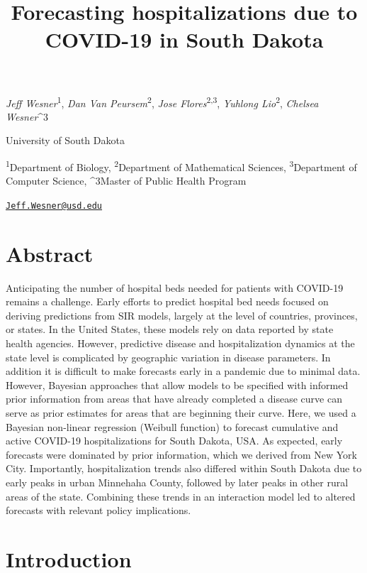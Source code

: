 \documentclass[
]{article}
\title{Forecasting hospitalizations due to COVID-19 in South Dakota}
\author{}
\date{\vspace{-2.5em}}
\begin{document}
\maketitle

\emph{Jeff Wesner}\textsuperscript{1}, \emph{Dan Van Peursem}\textsuperscript{2}, \emph{Jose Flores}\textsuperscript{2,3}, \emph{Yuhlong Lio}\textsuperscript{2}, \emph{Chelsea Wesner}\^{}3

University of South Dakota

\textsuperscript{1}Department of Biology, \textsuperscript{2}Department of Mathematical Sciences, \textsuperscript{3}Department of Computer Science, \^{}3Master of Public Health Program

\href{mailto:Jeff.Wesner@usd.edu}{\nolinkurl{Jeff.Wesner@usd.edu}}

\hypertarget{abstract}{%
\section{Abstract}\label{abstract}}

Anticipating the number of hospital beds needed for patients with COVID-19 remains a challenge. Early efforts to predict hospital bed needs focused on deriving predictions from SIR models, largely at the level of countries, provinces, or states. In the United States, these models rely on data reported by state health agencies. However, predictive disease and hospitalization dynamics at the state level is complicated by geographic variation in disease parameters. In addition it is difficult to make forecasts early in a pandemic due to minimal data. However, Bayesian approaches that allow models to be specified with informed prior information from areas that have already completed a disease curve can serve as prior estimates for areas that are beginning their curve. Here, we used a Bayesian non-linear regression (Weibull function) to forecast cumulative and active COVID-19 hospitalizations for South Dakota, USA. As expected, early forecasts were dominated by prior information, which we derived from New York City. Importantly, hospitalization trends also differed within South Dakota due to early peaks in urban Minnehaha County, followed by later peaks in other rural areas of the state. Combining these trends in an interaction model led to altered forecasts with relevant policy implications.

\hypertarget{introduction}{%
\section{Introduction}\label{introduction}}
\end{document}

